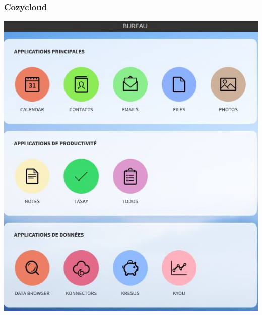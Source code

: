 \documentclass{beamer}
\begin{document}
\begin{frame}
\begin{center}
\frametitle{Cozycloud}
\includegraphics[scale=0.6] {./images/Cozycloud.jpg}
\end{center}
\end{frame}
\end{document}

